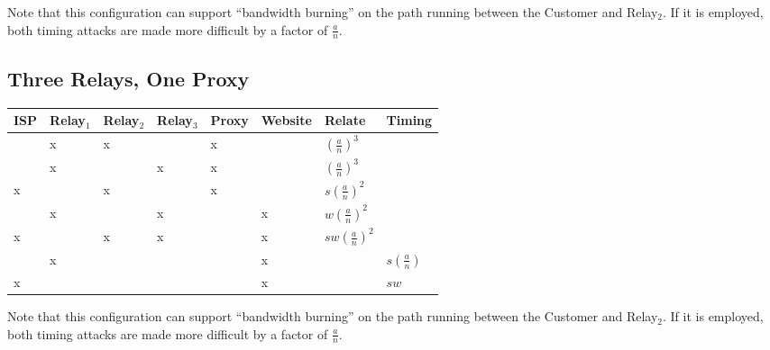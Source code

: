 
Note that this configuration can support ``bandwidth burning'' on the
path running between the Customer and Relay$_2$. If it is employed,
both timing attacks are made more difficult by a factor of
$\frac{a}{n}$.

\subsection{Three Relays, One Proxy}


\begin{center}
\begin{tabular}{l | l | l | l | l | l | l | l}
  ISP & Relay$_1$ & Relay$_2$ & Relay$_3$ & Proxy & Website & Relate             & Timing \\
  \hline
      & x         & x         &           & x     &         & $(\frac{a}{n})^3$  & \\
  \hline
      & x         &           & x         & x     &         & $(\frac{a}{n})^3$  & \\
  \hline
  x   &           & x         &           & x     &         & $s(\frac{a}{n})^2$ & \\
  \hline
      & x         &           & x         &       & x       & $w(\frac{a}{n})^2$ & \\
  \hline
  x   &           & x         & x         &       & x       & $sw(\frac{a}{n})^2$ & \\
  \hline
      & x         &           &           &       & x       &                    & $s(\frac{a}{n})$ \\
  \hline
  x   &           &           &           &       & x       &                    & $sw$ \\
\end{tabular}
\end{center}

Note that this configuration can support ``bandwidth burning'' on the
path running between the Customer and Relay$_2$. If it is employed,
both timing attacks are made more difficult by a factor of
$\frac{a}{n}$.

